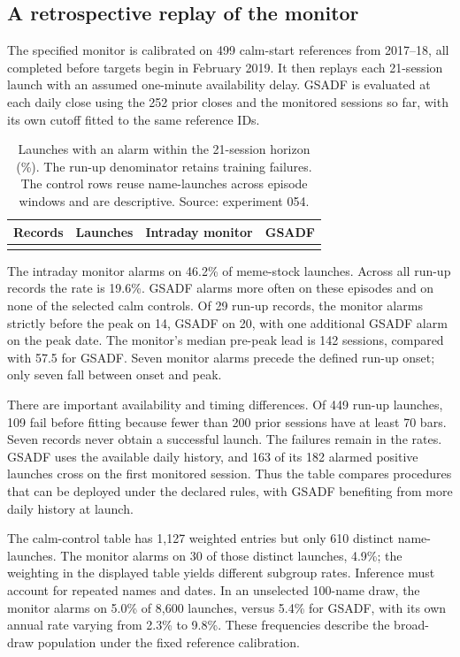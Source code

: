 \subsection{A retrospective replay of the monitor}
The specified monitor is calibrated on 499 calm-start references from
2017--18, all completed before targets begin in February 2019. It then
replays each 21-session launch with an assumed one-minute availability
delay. GSADF is evaluated at each daily close using the 252 prior closes
and the monitored sessions so far, with its own cutoff fitted to the
same reference IDs.

\begin{table}[htbp]\centering\small
\begin{tabularx}{\linewidth}{@{}Yrrr@{}}\toprule
Records & Launches & Intraday monitor & GSADF\\
\midrule
{}
\bottomrule\end{tabularx}
\caption{Launches with an alarm within the 21-session horizon (\%). The
run-up denominator retains training failures. The control rows reuse
name-launches across episode windows and are descriptive. Source:
experiment 054.}\label{tab:intraday}
\end{table}

The intraday monitor alarms on 46.2\% of meme-stock launches. Across all
run-up records the rate is 19.6\%. GSADF alarms
more often on these episodes and on none of the selected calm controls.
Of 29 run-up records, the monitor alarms strictly before the peak on 14,
GSADF on 20, with one additional GSADF alarm on the peak date. The
monitor's median pre-peak lead is 142 sessions, compared with 57.5 for
GSADF. Seven monitor alarms precede the defined run-up onset; only seven
fall between onset and peak.

There are important availability and timing differences. Of 449 run-up
launches, 109 fail before fitting because fewer than 200 prior sessions
have at least 70 bars. Seven records never obtain a successful launch.
The failures remain in the rates. GSADF uses the available daily history,
and 163 of its 182 alarmed positive launches cross on the first monitored
session. Thus the table compares procedures that can be deployed under
the declared rules, with GSADF benefiting from more daily history at launch.

The calm-control table has 1,127 weighted entries but only 610 distinct
name-launches. The monitor alarms on 30 of those distinct launches,
4.9\%; the weighting in the displayed table yields different subgroup
rates. Inference must account for repeated names and dates. In an
unselected 100-name draw, the monitor alarms on 5.0\% of 8,600 launches,
versus 5.4\% for GSADF, with its own annual rate varying from 2.3\% to
9.8\%. These frequencies describe the broad-draw population under the
fixed reference calibration.

